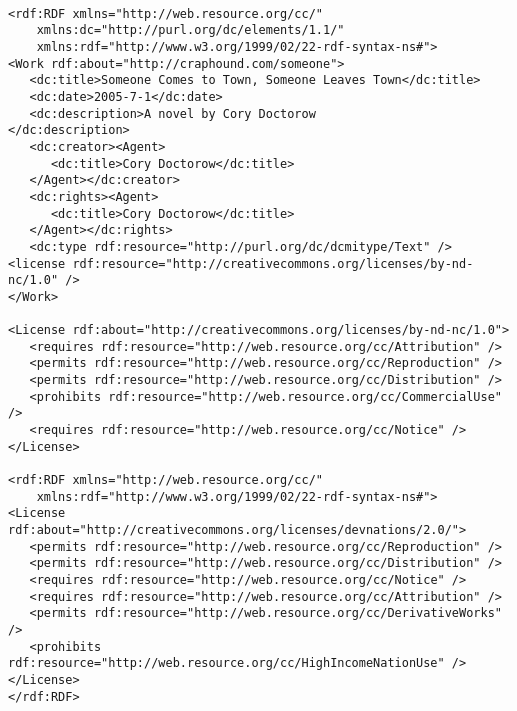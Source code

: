 \begin{verbatim}

<rdf:RDF xmlns="http://web.resource.org/cc/"
    xmlns:dc="http://purl.org/dc/elements/1.1/"
    xmlns:rdf="http://www.w3.org/1999/02/22-rdf-syntax-ns#">
<Work rdf:about="http://craphound.com/someone">
   <dc:title>Someone Comes to Town, Someone Leaves Town</dc:title>
   <dc:date>2005-7-1</dc:date>
   <dc:description>A novel by Cory Doctorow
</dc:description>
   <dc:creator><Agent>
      <dc:title>Cory Doctorow</dc:title>
   </Agent></dc:creator>
   <dc:rights><Agent>
      <dc:title>Cory Doctorow</dc:title>
   </Agent></dc:rights>
   <dc:type rdf:resource="http://purl.org/dc/dcmitype/Text" />
<license rdf:resource="http://creativecommons.org/licenses/by-nd-nc/1.0" />
</Work>

<License rdf:about="http://creativecommons.org/licenses/by-nd-nc/1.0">
   <requires rdf:resource="http://web.resource.org/cc/Attribution" />
   <permits rdf:resource="http://web.resource.org/cc/Reproduction" />
   <permits rdf:resource="http://web.resource.org/cc/Distribution" />
   <prohibits rdf:resource="http://web.resource.org/cc/CommercialUse" />
   <requires rdf:resource="http://web.resource.org/cc/Notice" />
</License>

<rdf:RDF xmlns="http://web.resource.org/cc/"
    xmlns:rdf="http://www.w3.org/1999/02/22-rdf-syntax-ns#">
<License rdf:about="http://creativecommons.org/licenses/devnations/2.0/">
   <permits rdf:resource="http://web.resource.org/cc/Reproduction" />
   <permits rdf:resource="http://web.resource.org/cc/Distribution" />
   <requires rdf:resource="http://web.resource.org/cc/Notice" />
   <requires rdf:resource="http://web.resource.org/cc/Attribution" />
   <permits rdf:resource="http://web.resource.org/cc/DerivativeWorks" />
   <prohibits rdf:resource="http://web.resource.org/cc/HighIncomeNationUse" />
</License>
</rdf:RDF>

\end{verbatim}


